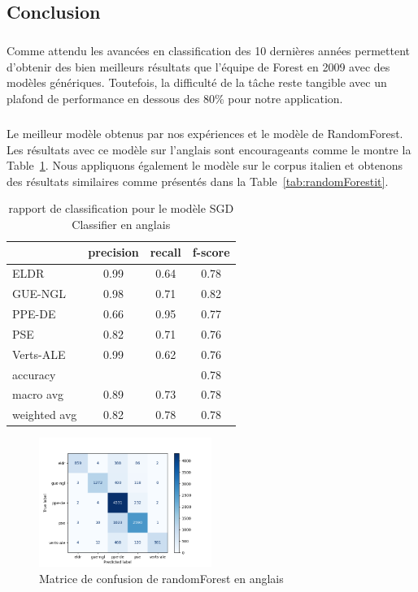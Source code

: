 \documentclass[11pt]{article}
\begin{document}
\subsection{Conclusion}
\subparagraph{}
Comme attendu les avancées en classification des 10 dernières années permettent d'obtenir des bien meilleurs résultats que l'équipe de Forest en 2009 avec des modèles génériques. Toutefois, la difficulté de la tâche reste tangible avec un plafond de performance en dessous des 80\% pour notre application.
\subparagraph{}
Le meilleur modèle obtenus par nos expériences et le modèle de RandomForest. Les résultats avec ce modèle sur l'anglais sont encourageants comme le montre la Table~\ref{tab:randomForesten}. Nous appliquons également le modèle sur le corpus italien et obtenons des résultats similaires comme présentés dans la Table~\ref{tab:randomForestit}.

\begin{table}[h]
\centering
\begin{tabular}{lccc}
\hline
 & precision & recall & f-score\\
\hline
ELDR & 0.99 & 0.64 &  0.78\\
GUE-NGL& 0.98 & 0.71 & 0.82\\
PPE-DE & 0.66& 0.95 & 0.77 \\ 
PSE &  0.82 & 0.71 & 0.76\\ 
Verts-ALE &  0.99& 0.62 &  0.76\\
\hline
accuracy& & &    0.78 \\
macro avg &  0.89 & 0.73 &  0.78 \\
weighted avg &  0.82 &0.78 &0.78 \\
\hline
\end{tabular}
\caption{rapport de classification pour le modèle SGD Classifier en anglais}
\label{tab:randomForesten}
\end{table}

\begin{figure}[h]
\includegraphics[width=0.5\textwidth]{matriceConfusionrandomforesten}
\caption{Matrice de confusion de randomForest en anglais}
\centering
\end{figure}
\end{document}
